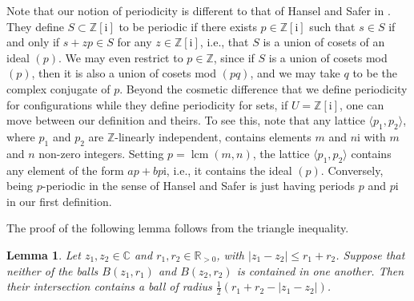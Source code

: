 \documentclass{amsart}
\newcommand{\Z}{\mathbb{Z}}
\newcommand{\R}{\mathbb{R}}
\newcommand{\C}{\mathbb{C}}
\newcommand{\tcb}{\textcolor{blue}}
\newcommand{\ii}{\mathrm{i}}
\DeclareMathOperator{\lcm}{lcm}
\newtheorem*{main theorem}{Theorem \ref{thm:main-gaussian}}
\newtheorem{lemma}[theorem]{Lemma}
\theoremstyle{definition}
\begin{document}
Note that our notion of periodicity is different to that of Hansel and Safer in \cite{Hansel-Safer}. They define $S\subset \Z[\ii]$ to be periodic if there exists $p\in \Z[\ii]$ such that $s\in S$ if and only if $s+zp\in S$ for any $z\in \Z[\ii]$, i.e., that $S$ is a union of cosets of an ideal $(p)$. 
We may even restrict to $p\in \Z$, since if $S$ is a union of cosets mod $(p)$, then it is also a union of
cosets mod $(pq)$, and we may take $q$ to be the complex conjugate of $p$.
Beyond the cosmetic difference that we define periodicity for configurations while they define periodicity for sets, if $U=\Z[\ii] $, one can move between our definition and theirs.  To see this, note that  any lattice $ \langle p_1,p_2\rangle$, where $p_1$ and $p_2$ are  $\Z$-linearly independent, contains elements  $m $ and $n \ii $ with $m$ and $n$  non-zero integers. Setting $p = \lcm(m,n)$,  the lattice  $ \langle p_1,p_2\rangle$ contains any element of the form $ap+bp\ii$, i.e., it contains the ideal $(p)$.  Conversely, being $p$-periodic in the sense of Hansel and Safer  is just
having periods $p$ and $p \ii $ in our first definition.
 






The proof of the following lemma follows from the triangle inequality.

\begin{lemma} \label{lem:intersection-lemma}
    Let $z_1,z_2\in\C$ and $r_1,r_2\in\R_{>0}$, with $\lvert z_1-z_2\rvert \le r_1 + r_2$. Suppose that neither of the balls $B(z_1,r_1)$ and $B(z_2,r_2)$ is contained in one another. Then their intersection contains a ball of radius $\frac{1}{2}(r_1+r_2-\lvert z_1 - z_2\rvert)$.
\end{lemma}

%
\end{document}
